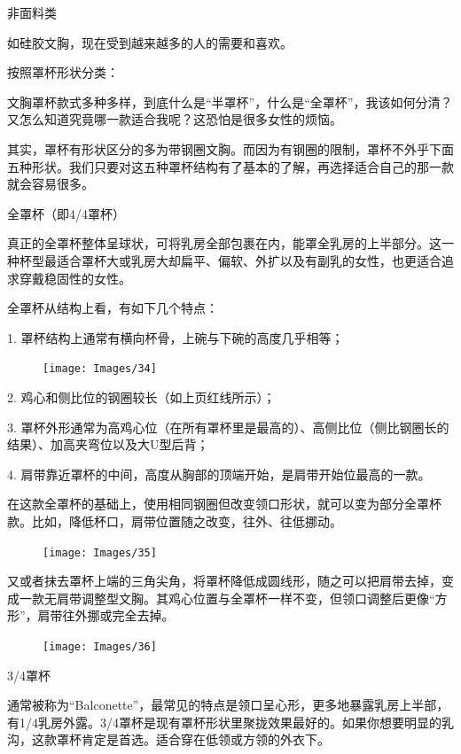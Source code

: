 \documentclass[12pt,UTF8]{ctexbook}
\begin{document}
非面料类

如硅胶文胸，现在受到越来越多的人的需要和喜欢。

按照罩杯形状分类：

文胸罩杯款式多种多样，到底什么是“半罩杯”，什么是“全罩杯”，我该如何分清？又怎么知道究竟哪一款适合我呢？这恐怕是很多女性的烦恼。

其实，罩杯有形状区分的多为带钢圈文胸。而因为有钢圈的限制，罩杯不外乎下面五种形状。我们只要对这五种罩杯结构有了基本的了解，再选择适合自己的那一款就会容易很多。

全罩杯（即4/4罩杯）

真正的全罩杯整体呈球状，可将乳房全部包裹在内，能罩全乳房的上半部分。这一种杯型最适合罩杯大或乳房大却扁平、偏软、外扩以及有副乳的女性，也更适合追求穿戴稳固性的女性。

全罩杯从结构上看，有如下几个特点：

1. 罩杯结构上通常有横向杯骨，上碗与下碗的高度几乎相等；

\begin{figure}[htbp]
	\centering
	\texttt{[image: Images/34]}
	\caption{}
	\label{fig:1}
\end{figure}

2. 鸡心和侧比位的钢圈较长（如上页红线所示）；

3. 罩杯外形通常为高鸡心位（在所有罩杯里是最高的）、高侧比位（侧比钢圈长的结果）、加高夹弯位以及大U型后背；

4. 肩带靠近罩杯的中间，高度从胸部的顶端开始，是肩带开始位最高的一款。

在这款全罩杯的基础上，使用相同钢圈但改变领口形状，就可以变为部分全罩杯款。比如，降低杯口，肩带位置随之改变，往外、往低挪动。

\begin{figure}[htbp]
	\centering
	\texttt{[image: Images/35]}
	\caption{}
	\label{fig:1}
\end{figure}

又或者抹去罩杯上端的三角尖角，将罩杯降低成圆线形，随之可以把肩带去掉，变成一款无肩带调整型文胸。其鸡心位置与全罩杯一样不变，但领口调整后更像“方形”，肩带往外挪或完全去掉。

\begin{figure}[htbp]
	\centering
	\texttt{[image: Images/36]}
	\caption{}
	\label{fig:1}
\end{figure}

3/4罩杯

通常被称为“Balconette”，最常见的特点是领口呈心形，更多地暴露乳房上半部，有1/4乳房外露。3/4罩杯是现有罩杯形状里聚拢效果最好的。如果你想要明显的乳沟，这款罩杯肯定是首选。适合穿在低领或方领的外衣下。
\end{document}
